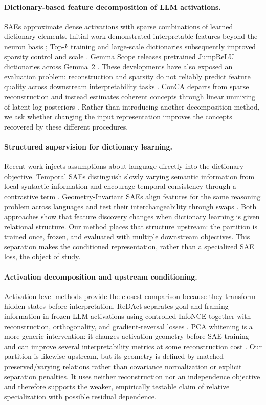 \documentclass[11pt]{article}
\begin{document}
\paragraph{Dictionary-based feature decomposition of LLM activations.}
SAEs approximate dense activations with sparse combinations of learned dictionary elements. Initial work demonstrated interpretable features beyond the neuron basis \citep{cunningham2023sparse}; Top-$k$ training and large-scale dictionaries subsequently improved sparsity control and scale \citep{gao2024scaling}. Gemma Scope releases pretrained JumpReLU dictionaries across Gemma~2 \citep{lieberum2024gemmascope}. These developments have also exposed an evaluation problem: reconstruction and sparsity do not reliably predict feature quality across downstream interpretability tasks \citep{karvonen2025saebench}. ConCA departs from sparse reconstruction and instead estimates coherent concepts through linear unmixing of latent log-posteriors \citep{liu2026conca}. Rather than introducing another decomposition method, we ask whether changing the input representation improves the concepts recovered by these different procedures.

\paragraph{Structured supervision for dictionary learning.}
Recent work injects assumptions about language directly into the dictionary objective. Temporal SAEs distinguish slowly varying semantic information from local syntactic information and encourage temporal consistency through a contrastive term \citep{bhalla2026temporal}. Geometry-Invariant SAEs align features for the same reasoning problem across languages and test their interchangeability through swaps \citep{bogdanov2026geometry}. Both approaches show that feature discovery changes when dictionary learning is given relational structure. Our method places that structure upstream: the partition is trained once, frozen, and evaluated with multiple downstream objectives. This separation makes the conditioned representation, rather than a specialized SAE loss, the object of study.

\paragraph{Activation decomposition and upstream conditioning.}
Activation-level methods provide the closest comparison because they transform hidden states before interpretation. ReDAct separates goal and framing information in frozen LLM activations using controlled InfoNCE together with reconstruction, orthogonality, and gradient-reversal losses \citep{farzam2026hiding}. PCA whitening is a more generic intervention: it changes activation geometry before SAE training and can improve several interpretability metrics at some reconstruction cost \citep{saraswatula2025whitening}. Our partition is likewise upstream, but its geometry is defined by matched preserved/varying relations rather than covariance normalization or explicit separation penalties. It uses neither reconstruction nor an independence objective and therefore supports the weaker, empirically testable claim of relative specialization with possible residual dependence.
\end{document}
